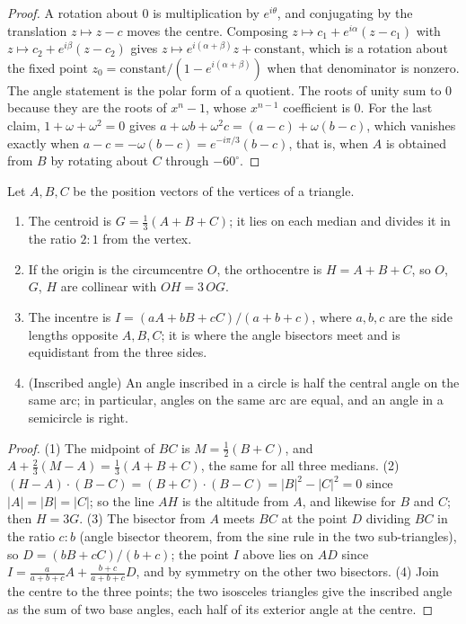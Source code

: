 \begin{proof}
A rotation about $0$ is multiplication by $e^{i\theta}$, and conjugating by the translation $z\mapsto z-c$ moves the centre. Composing $z\mapsto c_1+e^{i\alpha}(z-c_1)$ with $z\mapsto c_2+e^{i\beta}(z-c_2)$ gives $z\mapsto e^{i(\alpha+\beta)}z+\text{constant}$, which is a rotation about the fixed point $z_0=\text{constant}/(1-e^{i(\alpha+\beta)})$ when that denominator is nonzero. The angle statement is the polar form of a quotient. The roots of unity sum to $0$ because they are the roots of $x^n-1$, whose $x^{n-1}$ coefficient is $0$. For the last claim, $1+\omega+\omega^2=0$ gives $a+\omega b+\omega^2c=(a-c)+\omega(b-c)$, which vanishes exactly when $a-c=-\omega(b-c)=e^{-i\pi/3}(b-c)$, that is, when $A$ is obtained from $B$ by rotating about $C$ through $-60^\circ$.
\end{proof}

\begin{proposition}
Let $A,B,C$ be the position vectors of the vertices of a triangle.
\begin{enumerate}[nosep]
\item The centroid is $G=\tfrac13(A+B+C)$; it lies on each median and divides it in the ratio $2:1$ from the vertex.
\item If the origin is the circumcentre $O$, the orthocentre is $H=A+B+C$, so $O$, $G$, $H$ are collinear with $OH=3\,OG$.
\item The incentre is $I=(aA+bB+cC)/(a+b+c)$, where $a,b,c$ are the side lengths opposite $A,B,C$; it is where the angle bisectors meet and is equidistant from the three sides.
\item (Inscribed angle) An angle inscribed in a circle is half the central angle on the same arc; in particular, angles on the same arc are equal, and an angle in a semicircle is right.
\end{enumerate}
\end{proposition}

\begin{proof}
(1) The midpoint of $BC$ is $M=\tfrac12(B+C)$, and $A+\tfrac23(M-A)=\tfrac13(A+B+C)$, the same for all three medians. (2) $(H-A)\cdot(B-C)=(B+C)\cdot(B-C)=|B|^2-|C|^2=0$ since $|A|=|B|=|C|$; so the line $AH$ is the altitude from $A$, and likewise for $B$ and $C$; then $H=3G$. (3) The bisector from $A$ meets $BC$ at the point $D$ dividing $BC$ in the ratio $c:b$ (angle bisector theorem, from the sine rule in the two sub-triangles), so $D=(bB+cC)/(b+c)$; the point $I$ above lies on $AD$ since $I=\frac{a}{a+b+c}A+\frac{b+c}{a+b+c}D$, and by symmetry on the other two bisectors. (4) Join the centre to the three points; the two isosceles triangles give the inscribed angle as the sum of two base angles, each half of its exterior angle at the centre.
\end{proof}


